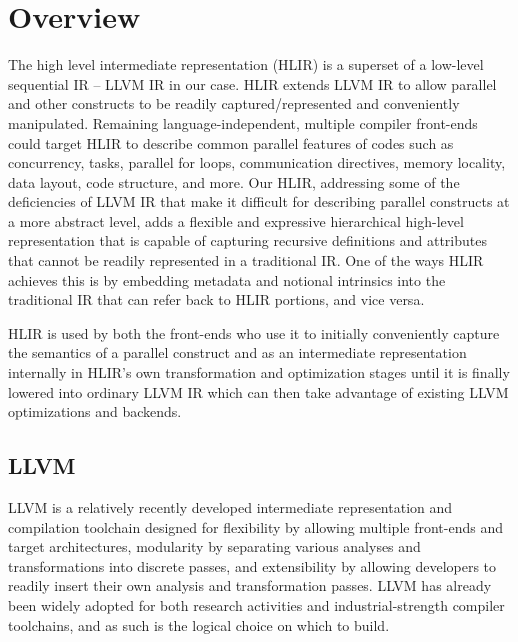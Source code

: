\documentclass[12pt]{article}
\begin{document}
\maketitle

\section{Overview}

The high level intermediate representation (HLIR) is a superset of a low-level sequential IR -- LLVM IR in our case. HLIR extends LLVM IR to allow parallel and other constructs to be readily captured/represented and conveniently manipulated. Remaining language-independent, multiple compiler front-ends could target HLIR to describe common parallel features of codes such as concurrency, tasks, parallel for loops, communication directives, memory locality, data layout, code structure, and more. Our HLIR, addressing some of the deficiencies of LLVM IR that make it difficult for describing parallel constructs at a more abstract level, adds a flexible and expressive hierarchical high-level representation that is capable of capturing recursive definitions and attributes that cannot be readily represented in a traditional IR. One of the ways HLIR achieves this is by embedding metadata and notional intrinsics into the traditional IR that can refer back to HLIR portions, and vice versa.

HLIR is used by both the front-ends who use it to initially conveniently capture the semantics of a parallel construct and as an intermediate representation internally in HLIR's own transformation and optimization stages until it is finally lowered into ordinary LLVM IR which can then take advantage of existing LLVM optimizations and backends.

\subsection{LLVM}

LLVM is a relatively recently developed intermediate representation and compilation toolchain designed for flexibility by allowing multiple front-ends and target architectures, modularity by separating various analyses and transformations into discrete passes, and extensibility by allowing developers to readily insert their own analysis and transformation passes. LLVM has already been widely adopted for both research activities and industrial-strength compiler toolchains, and as such is the logical choice on which to build.
\end{document}
